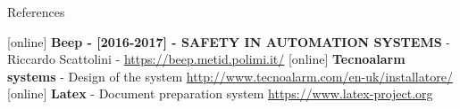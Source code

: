 \begin{frame}{References}
\begin{thebibliography}{9}
[online]
 \textbf{Beep - [2016-2017] - SAFETY IN AUTOMATION SYSTEMS} - Riccardo Scattolini -
				\url{https://beep.metid.polimi.it/}
[online]
 \textbf{Tecnoalarm systems} - Design of the system
				\url{http://www.tecnoalarm.com/en-uk/installatore/}
[online]
 \textbf{Latex} - Document preparation system
				\url{https://www.latex-project.org}


\end{thebibliography}
\end{frame}
